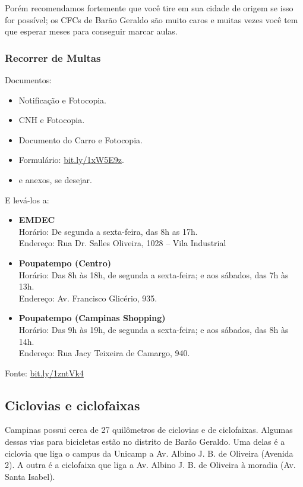 Porém recomendamos fortemente que você tire em sua cidade de origem se isso for
possível; os CFCs de Barão Geraldo são muito caros e muitas vezes você tem que
esperar meses para conseguir marcar aulas.

\subsubsection{Recorrer de Multas}

Documentos:
\begin{itemize}
    \item Notificação e Fotocopia.
    \item CNH e Fotocopia.
    \item Documento do Carro e Fotocopia.
    \item Formulário:
      \url{bit.ly/1xW5E9z}.
    \item e anexos, se desejar.
\end{itemize}

E levá-los a:
\begin{itemize}
    \item \textbf{EMDEC} 
        \\Horário: De segunda a sexta-feira, das 8h as 17h.
        \\Endereço: Rua Dr. Salles Oliveira, 1028 -- Vila Industrial
    
    \item \textbf{Poupatempo (Centro)} 
        \\Horário: Das 8h às 18h, de segunda a sexta-feira; 
                    e aos sábados, das 7h às 13h.  
        \\Endereço: Av. Francisco Glicério, 935.
        
    \item \textbf{Poupatempo (Campinas Shopping)} 
        \\Horário: Das 9h às 19h, de segunda a sexta-feira; 
                    e aos sábados, das 8h às 14h.  
        \\Endereço: Rua Jacy Teixeira de Camargo, 940.
\end{itemize}

Fonte:
\url{bit.ly/1zntVk4}

\subsection{Ciclovias e ciclofaixas}

Campinas possui cerca de 27 quilômetros de ciclovias e de ciclofaixas. Algumas
dessas vias para bicicletas estão no distrito de Barão Geraldo. Uma delas é a
ciclovia que liga o campus da Unicamp a Av. Albino J. B. de Oliveira (Avenida 2).
A outra é a ciclofaixa que liga a Av. Albino J. B. de Oliveira à moradia (Av. Santa
Isabel).

